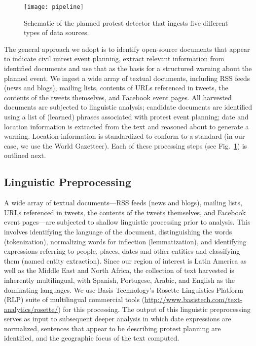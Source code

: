 
\begin{figure}
\texttt{[image: pipeline]}
\caption{Schematic of the planned protest detector that ingests five
different types of data sources.}
\label{flowchart}
\end{figure}
The general approach we adopt is to identify open-source documents
that appear to indicate civil unrest event planning, extract
relevant information from identified documents and use that as the
basis for a structured warning about the planned event. 
{\color{red} We ingest a wide array of textual documents, including RSS feeds (news and blogs),
mailing lists, contents of
URLs referenced in tweets, the contents of the tweets themselves,
and Facebook event pages.
All harvested documents are subjected to linguistic analysis; candidate
documents are identified using a list of (learned) phrases associated with
protest event planning; date and location information is extracted from the
text and reasoned about to generate a warning. Location information is standardized
to conform to a standard (in our case, we use the World Gazetteer).
Each of these processing
steps} (see Fig.~\ref{flowchart}) is outlined next.


\subsection{Linguistic Preprocessing}

A wide array of textual documents---RSS feeds (news and blogs),
mailing lists, URLs referenced in tweets, the contents of the tweets
themselves, and Facebook event pages---are subjected to shallow
linguistic processing prior to analysis.  This involves identifying
the language of the document, distinguishing the words (tokenization),
normalizing words for inflection (lemmatization), and identifying
expressions referring to people, places, dates and other entities and
classifying them (named entity extraction).  {\color{red} Since our region of
interest is Latin America as well as the Middle East and North Africa, the collection of text harvested is
inherently multilingual, with Spanish, Portugese, Arabic, and English as the
dominating languages.} We use Basis Technology's Rosette Linguistics
Platform (RLP) suite of multilingual commercial tools
(\url{http://www.basistech.com/text-analytics/rosette/}) for this
processing.  The output of this linguistic preprocessing serves as input to
subsequent deeper analysis in which date expressions are normalized, sentences that
appear to be describing protest planning are identified, 
and the geographic focus of the text computed.\\

